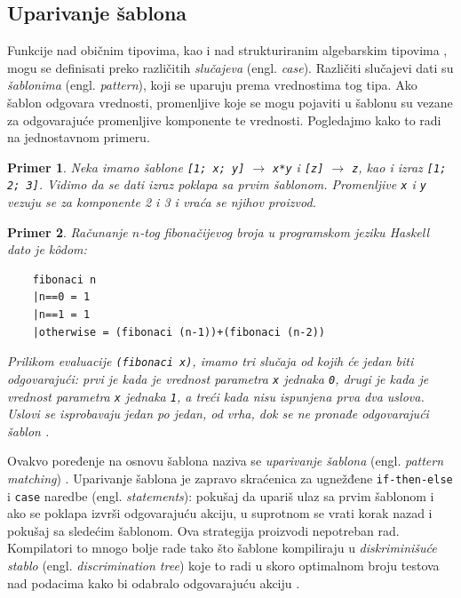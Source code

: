 \documentclass[a4paper]{article}
\newtheorem{primer}{Primer}[section]
\begin{document}
\subsection{Uparivanje šablona}

Funkcije nad običnim tipovima, kao i nad strukturiranim algebarskim tipovima \cite{algebraic-types}, mogu se definisati preko različitih \textit{slučajeva} (engl. \textit{case}). Različiti slučajevi dati su \textit{šablonima} (engl. \textit{pattern}), koji se uparuju prema vrednostima tog tipa. Ako šablon odgovara vrednosti, promenljive koje se mogu pojaviti u šablonu su vezane za odgovarajuće promenljive komponente te vrednosti. Pogledajmo kako to radi na jednostavnom primeru. 


\begin{primer}
	Neka imamo šablone \verb|[1; x; y]| $\longrightarrow$ \verb|x*y| i \verb|[z]| $\longrightarrow$ \verb|z|, kao i izraz \verb|[1; 2; 3]|. Vidimo da se dati izraz poklapa sa prvim šablonom. Promenljive \verb|x| i \verb|y| vezuju se za komponente 2 i 3 i vraća se njihov proizvod.
\end{primer}


\begin{primer}
	Računanje $n$-tog fibonačijevog broja u programskom jeziku Haskell dato je k\^odom:
	\begin{verbatim}
	fibonaci n
	|n==0 = 1
	|n==1 = 1
	|otherwise = (fibonaci (n-1))+(fibonaci (n-2))
	\end{verbatim}
	Prilikom evaluacije \verb|(fibonaci x)|, imamo tri slučaja od kojih će jedan biti odgovarajući: prvi je kada je vrednost parametra \verb|x| jednaka \verb|0|, drugi je kada je vrednost parametra \verb|x| jednaka \verb|1|, a treći kada nisu ispunjena prva dva uslova. Uslovi se isprobavaju jedan po jedan, od vrha, dok se ne pronađe odgovarajući šablon \cite{the-implementation-of-functional-programming-languages}.
\end{primer}

Ovakvo poređenje na osnovu šablona naziva se \textit{uparivanje šablona} (engl. \textit{pattern matching}) \cite{compiler-design}. Uparivanje šablona je zapravo skraćenica za ugnežđene \verb|if-then-else| i \verb|case| naredbe (engl. \textit{statements}): pokušaj da upariš ulaz sa prvim šablonom i ako se poklapa izvrši odgovarajuću akciju, u suprotnom se vrati korak nazad i pokušaj sa sledećim šablonom. Ova strategija proizvodi nepotreban rad. Kompilatori to mnogo bolje rade tako što šablone kompiliraju u \textit{diskriminišuće stablo} (engl. \textit{discrimination tree}) koje to radi u skoro optimalnom broju testova nad podacima kako bi odabralo odgovarajuću akciju \cite{compiling-fl}.
\end{document}
